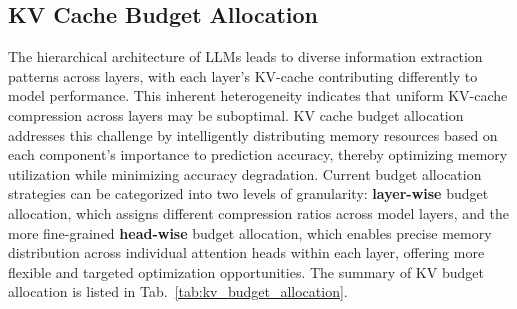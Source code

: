 \subsection{KV Cache Budget Allocation} \label{ssec:kv_budget}
The hierarchical architecture of LLMs leads to diverse information extraction patterns across layers, 
with each layer's KV-cache contributing differently to model performance. 
This inherent heterogeneity indicates that uniform KV-cache compression across layers may be suboptimal. 
KV cache budget allocation addresses this challenge by intelligently distributing memory resources based on 
each component's importance to prediction accuracy, thereby optimizing memory utilization while minimizing 
accuracy degradation. Current budget allocation strategies can be categorized into two levels of granularity: 
\textbf{layer-wise} budget allocation, which assigns different compression ratios across model layers, and the more 
fine-grained \textbf{head-wise} budget allocation, which enables precise memory distribution across individual attention 
heads within each layer, offering more flexible and targeted optimization opportunities.
The summary of KV budget allocation is listed in Tab.~\ref{tab:kv_budget_allocation}.




